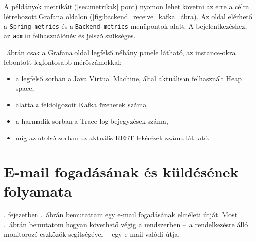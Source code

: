 A példányok metrikáit (\ref{sec:metrikak} pont) nyomon lehet követni az erre a célra létrehozott Grafana oldalon (\ref{fig:backend_receive_kafka}~ábra). Az oldal elérhető a  \texttt{Spring metrics} és a \texttt{Backend metrics} menüpontok alatt. A bejelentkezéshez, az \texttt{admin} felhasználónév és jelszó szükséges.

~ábrán csak a Grafana oldal legfelső néhány panele látható, az instance-okra lebontott legfontosabb mérőszámokkal:

\begin{itemize}
	\item a legfelső sorban a Java Virtual Machine, által aktuálisan felhasznált Heap space,	
	\item alatta a feldolgozott Kafka üzenetek száma,
	\item a harmadik sorban a Trace log bejegyzések száma,
	\item míg az utolsó sorban az aktuális REST lekérések száma látható.
\end{itemize}



\section{E-mail fogadásának és küldésének folyamata}
. fejezetben .~ábrán bemutattam egy e-mail fogadásának elméleti útját. Most .~ábrán bemutatom hogyan követhető végig a rendszerben --~a rendelkezésre álló monitorozó eszközök segítségével~-- egy e-mail valódi útja.


